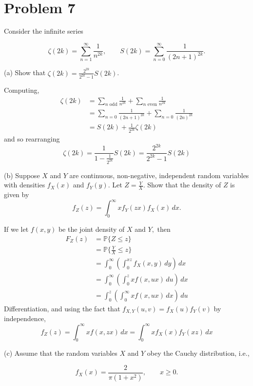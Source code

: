 \documentclass[11pt]{article}
\newcommand{\bbP}{\mathbb{P}}
\begin{document}
\newpage

\section*{Problem 7}
Consider the infinite series

\[
\zeta(2k) = \sum_{n=1}^\infty \frac{1}{n^{2k}}, \qquad S(2k) = \sum_{n=0}^\infty \frac{1}{(2n + 1)^{2k}}.
\]

(a) Show that \(\zeta(2k) = \frac{2^{2k}}{2^{2k} - 1} S(2k)\).

\begin{solution}
Computing,
\begin{align*}
\zeta(2k) &= \sum_{n\text{ odd}} \frac{1}{n^{2k}} + \sum_{n \text{ even}} \frac{1}{n^{2k}}\\ &= \sum_{n=0} \frac{1}{(2n + 1)^{2k}} + \sum_{n=0}\frac{1}{(2n)^{2k}}  \\
&= S(2k) + \frac{1}{2^{2k}}\zeta(2k)
\end{align*}
and so rearranging
\[\zeta(2k) = \frac{1}{1-\frac{1}{2^{2k}}}S(2k) = \frac{2^{2k}}{2^{2k} - 1}S(2k)\]

\end{solution}


(b) Suppose \(X\) and \(Y\) are continuous, non-negative, independent random variables with densities \(f_X(x)\) and \(f_Y(y)\). Let \(Z = \frac{Y}{X}\). Show that the density of \(Z\) is given by
\[
f_Z(z) = \int_0^\infty x f_Y(zx) f_X(x) \, dx.
\]

\begin{solution}
If we let $f(x,y)$ be the joint density of $X$ and $Y,$ then 
\begin{align*}
    F_Z(z) &= \bbP\{Z \leq z\}\\
    &= \bbP\{\frac{Y}{X} \leq z\}\\
    &= \int_0^\infty \left(\int_0^{xz}f_{X}(x,y)\,dy\right)\,dx\\
    &= \int_0^\infty\left(\int_0^z xf(x, ux)\,du\right)\,dx\\
    &= \int_0^z \left(\int_0^\infty xf(x, ux)\,dx\right)\,du
\end{align*}
Differentiation, and using the fact that $f_{X,Y}(u,v) = f_X(u)f_Y(v)$ by independence,
\[f_Z(z) = \int_0^\infty x f(x,zx)\,dx = \int_0^\infty x f_X(x) f_Y(xz)\,dx\]
\end{solution}

(c) Assume that the random variables \(X\) and \(Y\) obey the Cauchy distribution, i.e.,

\[
f_X(x) = \frac{2}{\pi (1 + x^2)}, \qquad x \geq 0.
\]
\end{document}
